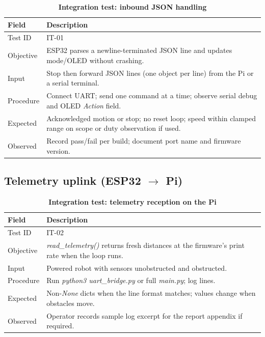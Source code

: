 \begin{table}[H]
\centering
\caption[Integration test: inbound JSON handling]{\textbf{Integration test: inbound JSON handling}}
\label{tab:it_json}
\begin{tabularx}{\textwidth}{|>{\raggedright\arraybackslash}p{3.1cm}|X|}
\hline
\textbf{Field} & \textbf{Description} \\
\hline
Test ID & IT-01 \\ \hline
Objective & ESP32 parses a newline-terminated JSON line and updates mode/OLED without crashing. \\ \hline
Input & Stop then forward JSON lines (one object per line) from the Pi or a serial terminal. \\ \hline
Procedure & Connect UART; send one command at a time; observe serial debug and OLED \textit{Action} field. \\ \hline
Expected & Acknowledged motion or stop; no reset loop; speed within clamped range on scope or duty observation if used. \\ \hline
Observed & Record pass/fail per build; document port name and firmware version. \\
\hline
\end{tabularx}
\end{table}

\subsection[Telemetry uplink]{Telemetry uplink (ESP32 $\rightarrow$ Pi)}
\label{subsec:it_telemetry_up}

\begin{table}[H]
\centering
\caption[Integration test: telemetry reception on the Pi]{\textbf{Integration test: telemetry reception on the Pi}}
\label{tab:it_telem_up}
\begin{tabularx}{\textwidth}{|>{\raggedright\arraybackslash}p{3.1cm}|X|}
\hline
\textbf{Field} & \textbf{Description} \\
\hline
Test ID & IT-02 \\
\hline
Objective & \textit{read\_telemetry()} returns fresh distances at the firmware’s print rate when the loop runs. \\
\hline
Input & Powered robot with sensors unobstructed and obstructed. \\
\hline
Procedure & Run \textit{python3 uart\_bridge.py} or full \textit{main.py}; log lines. \\
\hline
Expected & Non-\textit{None} dicts when the line format matches; values change when obstacles move. \\
\hline
Observed & Operator records sample log excerpt for the report appendix if required. \\
\hline
\end{tabularx}
\end{table}

